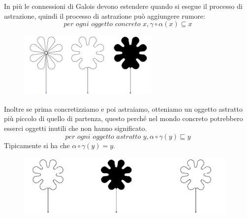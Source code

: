 In più le connessioni di Galois devono estendere quando si esegue 
il processo di astrazione, quindi il processo di astrazione può aggiungere 
rumore:
\[
    \textit{per ogni oggetto concreto } x, \gamma \circ \alpha(x) \subseteq x
\]
\begin{figure}[H]
    \centering
    \includegraphics[scale=0.6]{img/galoisconn3.png}
\end{figure}
Inoltre se prima concretizziamo e poi astraiamo, otteniamo
un oggetto astratto più piccolo di quello di partenza, questo perché 
nel mondo concreto potrebbero esserci oggetti inutili che non hanno significato.
\[
    \textit{per ogni oggetto astratto } y, \alpha \circ \gamma(y) \sqsubseteq  y
\]
Tipicamente si ha che $\alpha \circ \gamma(y) = y$.
\begin{figure}[H]
    \centering
    \includegraphics[scale=0.6]{img/galoisconn4.png}
\end{figure}
